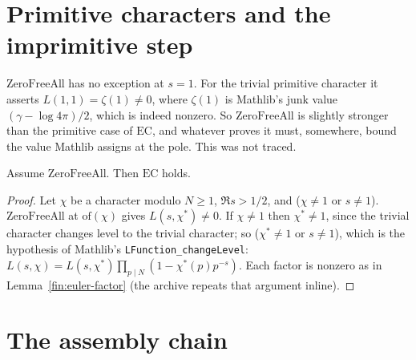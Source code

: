 \section{Primitive characters and the imprimitive step}





\begin{remark}[the trivial character at $s=1$]\label{fin:rem-junk}
$\mathrm{ZeroFreeAll}$ has no exception at $s=1$. For the trivial primitive
character it asserts $L(1,1)=\zeta(1)\ne0$, where $\zeta(1)$ is Mathlib's junk
value $(\gamma-\log4\pi)/2$, which is indeed nonzero. So $\mathrm{ZeroFreeAll}$
is slightly stronger than the primitive case of $\mathrm{EC}$, and whatever
proves it must, somewhere, bound the value Mathlib assigns at the pole. This was
not traced.
\end{remark}

\begin{lemma}\label{fin:imprimitive}
Assume $\mathrm{ZeroFreeAll}$. Then $\mathrm{EC}$ holds.
\end{lemma}
\begin{proof}
Let $\chi$ be a character modulo $N\ge1$, $\Re s>1/2$, and ($\chi\ne1$ or
$s\ne1$). $\mathrm{ZeroFreeAll}$ at $\mathrm{of}(\chi)$ gives
$L(s,\chi^{\ast})\ne0$. If $\chi\ne1$ then $\chi^{\ast}\ne1$, since the trivial
character changes level to the trivial character; so ($\chi^{\ast}\ne1$ or
$s\ne1$), which is the hypothesis of Mathlib's \texttt{LFunction\_changeLevel}:
$L(s,\chi)=L(s,\chi^{\ast})\prod_{p\mid N}(1-\chi^{\ast}(p)p^{-s})$. Each factor is
nonzero as in Lemma~\ref{fin:euler-factor} (the archive repeats that argument
inline).
\end{proof}

\section{The assembly chain}

